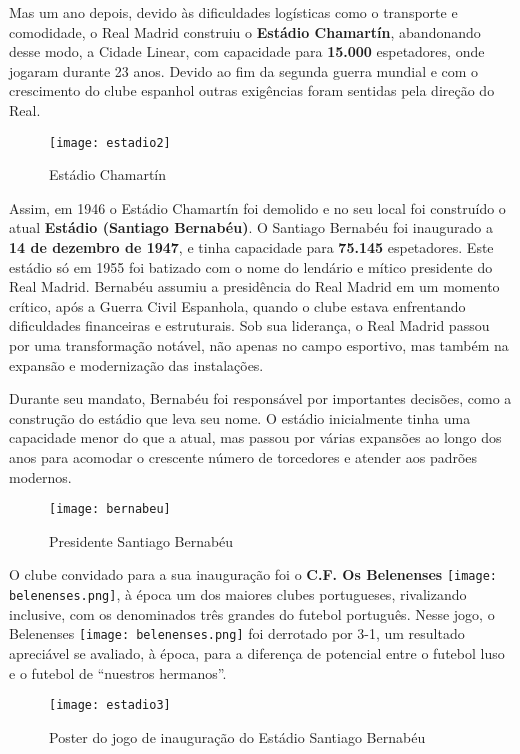 \documentclass{report}
\begin{document}
Mas um ano depois, devido às dificuldades logísticas como o transporte e comodidade, o Real Madrid construiu o \textbf{Estádio Chamartín}, abandonando desse modo, a Cidade Linear, com capacidade para \textbf{15.000} espetadores, onde jogaram durante 23 anos. Devido ao fim da segunda guerra mundial e com o crescimento do clube espanhol outras exigências foram sentidas pela direção do Real.
\begin{figure}[h]
    \centering
    \texttt{[image: estadio2]}
    \caption{Estádio Chamartín}
    \label{fig:estadio2}
\end{figure}

Assim, em 1946 o Estádio Chamartín foi demolido e no seu local foi construído o atual \textbf{Estádio (Santiago Bernabéu)}. O Santiago Bernabéu foi inaugurado a \textbf{14 de dezembro de 1947}, e tinha capacidade para \textbf{75.145} espetadores. Este estádio só em 1955 foi batizado com o nome do lendário e mítico presidente do Real Madrid. Bernabéu assumiu a presidência do Real Madrid em um momento crítico, após a Guerra Civil Espanhola, quando o clube estava enfrentando dificuldades financeiras e estruturais. Sob sua liderança, o Real Madrid passou por uma transformação notável, não apenas no campo esportivo, mas também na expansão e modernização das instalações.

Durante seu mandato, Bernabéu foi responsável por importantes decisões, como a construção do estádio que leva seu nome. O estádio inicialmente tinha uma capacidade menor do que a atual, mas passou por várias expansões ao longo dos anos para acomodar o crescente número de torcedores e atender aos padrões modernos.
\begin{figure}[h]
    \centering
    \texttt{[image: bernabeu]}
    \caption{Presidente Santiago Bernabéu}
    \label{fig:bernabeu}
\end{figure}

O clube convidado para a sua inauguração foi o \textbf{C.F. Os Belenenses} \texttt{[image: belenenses.png]}, à época um dos maiores clubes portugueses, rivalizando inclusive, com os denominados três grandes do futebol português.
Nesse jogo, o Belenenses \texttt{[image: belenenses.png]} foi derrotado por 3-1, um resultado apreciável se avaliado, à época, para a diferença de potencial entre o futebol luso e o futebol de “nuestros hermanos”.
\begin{figure}[h]
    \centering
    \texttt{[image: estadio3]}
    \caption{Poster do jogo de inauguração do Estádio Santiago Bernabéu}
    \label{fig:estadio3}
\end{figure}
\end{document}
